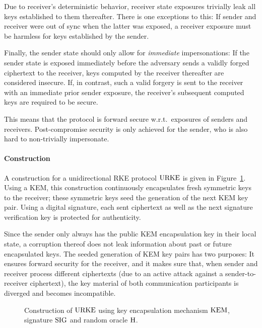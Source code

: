 Due to receiver's deterministic behavior, receiver state exposures trivially leak all keys established to them thereafter.
There is one exceptions to this:
If sender and receiver were out of sync when the latter was exposed, a receiver exposure must be harmless for keys established by the sender.

Finally, the sender state should only allow for \emph{immediate} impersonations:
If the sender state is exposed immediately before the adversary sends a validly forged ciphertext to the receiver, keys computed by the receiver thereafter are considered insecure.
If, in contrast, such a valid forgery is sent to the receiver with an immediate prior sender exposure, the receiver's subsequent computed keys are required to be secure.

This means that the protocol is forward secure w.r.t.\ exposures of senders and receivers.
Post-compromise security is only achieved for the sender, who is also hard to non-trivially impersonate.


\paragraph{Construction}
A construction for a unidirectional RKE protocol $\mathrm{URKE}$ is given in Figure~\ref{fig:urke:const}.
Using a KEM, this construction continuously encapsulates fresh symmetric keys to the receiver;
these symmetric keys seed the generation of the next KEM key pair.
Using a digital signature, each sent ciphertext as well as the next signature verification key is protected for authenticity.

Since the sender only always has the public KEM encapsulation key in their local state, a corruption thereof does not leak information about past or future encapsulated keys.
The seeded generation of KEM key pairs has two purposes:
It ensures forward security for the receiver, and it makes sure that, when sender and receiver process different ciphertexts (due to an active attack against a sender-to-receiver ciphertext), the key material of both communication participants is diverged and becomes incompatible.

\begin{figure}[!ht]
    \centering
    \nicoresetlinenr%
    \fbox{%
        \scalebox{\codescalefactor}{%
        }%
    }
    \caption{%
        Construction of $\mathrm{URKE}$ using key encapsulation mechanism $\mathrm{KEM}$, signature $\mathrm{SIG}$ and random oracle $\mathrm{H}$.
    }
    \label{fig:urke:const}
\end{figure}

